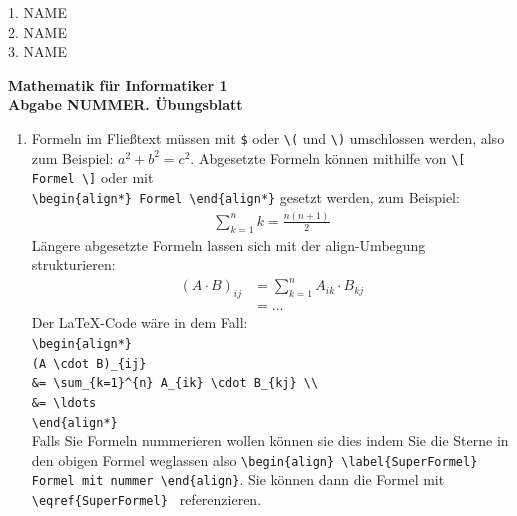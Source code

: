 \documentclass[a4paper,abstract,german]{scrreprt}
\begin{document}
\noindent
{\begin{flushright}
%
%	
1. NAME \\
2. NAME \\
3. NAME
\end{flushright}}
\begin{center}
	{\textbf  {Mathematik für Informatiker 1}} \\
	{\textbf {Abgabe NUMMER. Übungsblatt}}
\end{center}\vspace{0.3cm}

%
%
\begin{enumerate}
	
	
	\item[\textbf {H1.1}]
	Formeln im Fließtext müssen mit \verb|$| oder \verb|\(| und \verb|\)|
	umschlossen werden, also zum Beispiel:
	$a^2 + b^2 = c^2$.
	Abgesetzte Formeln können mithilfe von 
	\verb|\[ Formel \]| oder mit \\
	\verb|\begin{align*} Formel \end{align*}|
	gesetzt werden, zum
	Beispiel:
	\begin{align*}
		\sum_{k=1}^{n} k = \frac{n(n+1)}{2}
	\end{align*}
	Längere abgesetzte Formeln lassen sich mit der align-Umbegung %
	strukturieren:
	\begin{align*}
		(A \cdot B)_{ij}
		&= \sum_{k=1}^{n} A_{ik} \cdot B_{kj} \\
		&= \ldots
	\end{align*}
	Der \LaTeX -Code wäre in dem Fall:\\
	\verb|\begin{align*}|\\
	\verb|(A \cdot B)_{ij}| \\
	\verb|&= \sum_{k=1}^{n} A_{ik} \cdot B_{kj} \\| \\
	\verb|&= \ldots| \\
	\verb|\end{align*}| \\
	Falls Sie Formeln nummerieren wollen können sie dies indem Sie die Sterne in den obigen Formel weglassen also \verb|\begin{align} \label{SuperFormel} Formel mit nummer \end{align}|. Sie können dann die Formel mit \verb| \eqref{SuperFormel} | referenzieren.
	

\end{enumerate}
\end{document}
